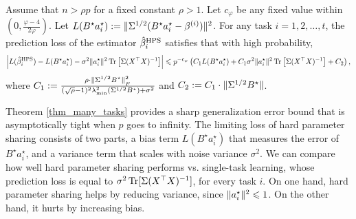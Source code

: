 \begin{theorem}\label{thm_many_tasks}
	Assume that $n > \rho p$ for a fixed constant $\rho > 1$.
	Let $c_{\varphi}$ be any fixed value within $(0, \frac{\varphi-4}{2\varphi})$.
	Let $L(B^{\star}a_i^{\star}): = \|\Sigma^{1/2} (B^{\star} a_i^{\star}- \beta^{(i)})\|^2$.
	For any task $i = 1, 2, \dots, t$, the prediction loss of the estimator $\hat{\beta}_i^{\textup{HPS}}$ satisfies that with high probability,
	\begin{align*}
		{\left| {L(\hat{\beta}_i^{\textup{HPS}}) - L(B^{\star}a_i^{\star}) - \sigma^2 \|a_i^{\star}\|^2 \operatorname{Tr}\left[\Sigma (X^{\top}X)^{-1}\right]} \right|}
		\leqslant  p^{-c_{\varphi}}\left({C_1 L(B^{\star}a_i^{\star}) + C_1 \sigma^2 \|a_i^{\star}\|^2 \operatorname{Tr}\left[\Sigma (X^{\top}X)^{-1}\right] + C_2}\right),
	\end{align*}
	where $C_1: = \frac{\rho\cdot \|\Sigma^{1/2} B^{\star}\|_{_{F}}^2}{(\sqrt{\rho} - 1)^2\lambda_{\min}^2(\Sigma^{1/2} B^{\star}) + \sigma^2}$ and $C_2 :=  C_1\cdot \|\Sigma^{1/2} B^{\star}\|$.
\end{theorem}
Theorem \ref{thm_many_tasks} provides a sharp generalization error bound that is asymptotically tight when $p$ goes to infinity.
The limiting loss of hard parameter sharing consists of two parts, a bias term $L(B^{\star} a_i^{\star})$ that measures the error of $B^{\star} a_i^{\star}$, and a variance term that scales with noise variance $\sigma^2$.
We can compare how well hard parameter sharing performs vs. single-task learning, whose prediction loss is equal to $\sigma^2 \operatorname{Tr}[\Sigma (X^{\top} X)^{-1}]$, for every task $i$.
On one hand, hard parameter sharing helps by reducing variance, since $\|a_i^{\star}\|^2 \leqslant 1$.
On the other hand, it hurts by increasing bias.


